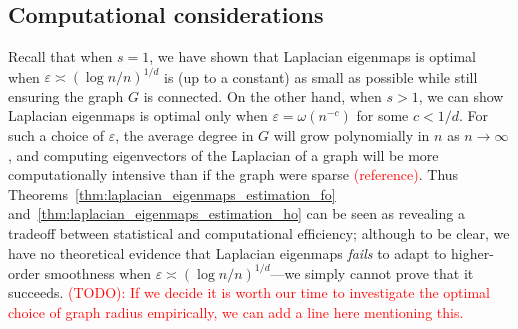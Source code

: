 \documentclass{article}
\newcommand{\1}{\mathbf{1}}
\theoremstyle{alden}
\theoremstyle{aldenthm}
\theoremstyle{definition}
\theoremstyle{remark}
\begin{document}
\subsection{Computational considerations}
Recall that when $s = 1$, we have shown that Laplacian eigenmaps is optimal when $\varepsilon \asymp (\log n/n)^{1/d}$ is (up to a constant) as small as possible while still ensuring the graph $G$ is connected. On the other hand, when $s > 1$, we can show Laplacian eigenmaps is optimal only when $\varepsilon = \omega(n^{-c})$ for some $c < 1/d$. For such a choice of $\varepsilon$, the average degree in $G$ will grow polynomially in $n$ as $n \to \infty$, and computing eigenvectors of the Laplacian of a graph will be more computationally intensive than if the graph were sparse \textcolor{red}{(reference)}. Thus Theorems~\ref{thm:laplacian_eigenmaps_estimation_fo} and~\ref{thm:laplacian_eigenmaps_estimation_ho} can be seen as revealing a tradeoff between statistical and computational efficiency; although to be clear, we have no theoretical evidence that Laplacian eigenmaps \emph{fails} to adapt to higher-order smoothness when $\varepsilon \asymp (\log n/n)^{1/d}$---we simply cannot prove that it succeeds. 
\textcolor{red}{(TODO): If we decide it is worth our time to investigate the optimal choice of graph radius empirically, we can add a line here mentioning this.}
\end{document}
